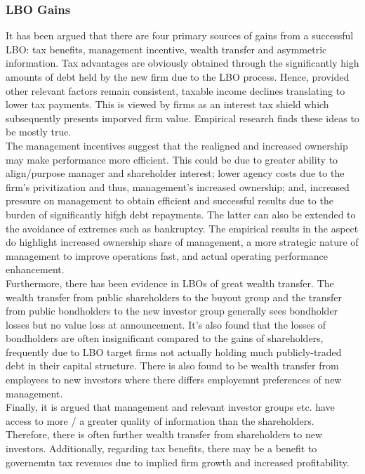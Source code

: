 \documentclass[11pt, english]{article}
\begin{document}
		\subsubsection*{LBO Gains}

	It has been argued that there are four primary sources of gains from a successful LBO: tax benefits, management incentive, wealth transfer and asymmetric information. Tax advantages are obviously obtained through the significantly high amounts of debt held by the new firm due to the LBO process. Hence, provided other relevant factors remain consistent, taxable income declines translating to lower tax payments. This is viewed by firms as an interest tax shield which subsequently presents imporved firm value. Empirical research finds these ideas to be mostly true.\\

	The management incentives suggest that the realigned and increased ownership may make performance more efficient. This could be due to greater ability to align/purpose manager and shareholder interest; lower agency costs due to the firm's privitization and thus, management's increased ownership; and, increased pressure on management to obtain efficient and successful results due to the burden of significantly hifgh debt repayments. The latter can also be extended to the avoidance of extremes such as bankruptcy. The empirical results in the aspect do highlight increased ownership share of management, a more strategic nature of management to improve operations fast, and actual operating performance enhancement.\\

	Furthermore, there has been evidence in LBOs of great wealth transfer. The wealth transfer from public shareholders to the buyout group and the transfer from public bondholders to the new investor group generally sees bondholder losses but no value loss at announcement. It's also found that the losses of bondholders are often insignificant compared to the gains of shareholders, frequently due to LBO target firms not actually holding much publicly-traded debt in their capital structure. There is also found to be wealth transfer from employees to new investors where there differs employemnt preferences of new management.\\

	Finally, it is argued that management and relevant investor groups etc. have access to more / a greater quality of information than the shareholders. Therefore, there is often further wealth transfer from shareholders to new investors. Additionally, regarding tax benefits, there may be a benefit to governemtn tax revenues due to implied firm growth and increased profitability.
\end{document}
